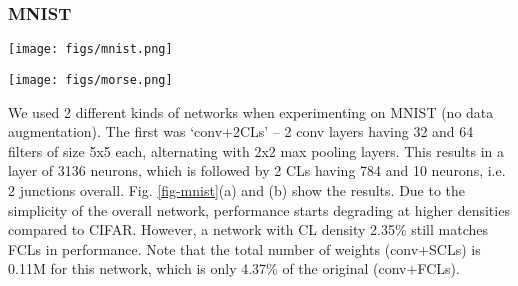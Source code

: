 \documentclass[conference]{IEEEtran}
\begin{document}
\subsubsection{MNIST}\label{anares-mnist}

\begin{figure*}[!t]
\begin{center}
\texttt{[image: figs/mnist.png]}
\end{center}
\caption{(a)--(b) Performance results of pre-defined sparsity on an MNIST conv network with different densities, each trained for 30 epochs. (c) Performance vs. connection density for different MNIST CL only networks, each trained for 100 epochs.}
\label{fig-mnist}
\end{figure*}

\begin{figure*}[!t]
\begin{center}
\texttt{[image: figs/morse.png]}
\end{center}
\caption{(a) Performance vs. connection density for a Morse CL only 2 junction network. (b) and (c) Performance results by varying individual junction densities while overall density is fixed at (b) 25\% (c) 50\%. All cases trained for 30 epochs.}
\label{fig-morse}
\end{figure*}

We used 2 different kinds of networks when experimenting on MNIST (no data augmentation). The first was `conv+2CLs' %
-- 2 conv layers having 32 and 64 filters of size 5x5 each, alternating with 2x2 max pooling layers. This results in a layer of 3136 neurons, which is followed by 2 CLs having 784 and 10 neurons, i.e. 2 junctions overall. Fig. \ref{fig-mnist}(a) and (b) show the results. Due to the simplicity of the overall network, performance starts degrading at higher densities compared to CIFAR. However, a network with CL density 2.35\% still matches FCLs in performance. Note that the total number of weights (conv+SCLs) is 0.11M for this network, which is only 4.37\% of the original (conv+FCLs). 
\end{document}

